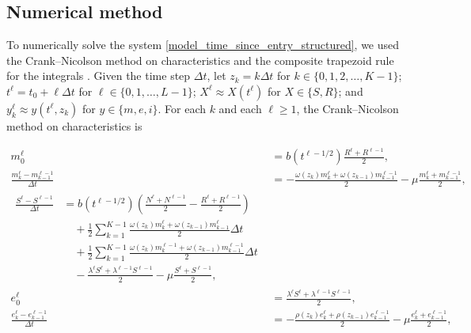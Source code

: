\documentclass{jpmarticle}
\let\subequationsorig\subequations%
\let\endsubequationsorig\endsubequations%
\renewenvironment{subequations}{
  \subequationsorig
  \renewcommand{\theequation}{\theparentequation.\arabic{equation}}
}{
  \endsubequationsorig
}
\begin{document}
\subsection{Numerical method}

To numerically solve the system
\eqref{model_time_since_entry_structured}, we used the Crank--Nicolson
method on characteristics and the composite trapezoid rule for the
integrals \autocite{milner_1992}.  Given the time step $\Delta t$,
let $z_k = k \Delta t$
for $k \in \{0, 1, 2, \ldots, K - 1\}$;
$t^{\ell} = t_0 + \ell \Delta t$
for $\ell \in \{0, 1, \ldots, L - 1\}$;
$X^{\ell} \approx X(t^{\ell})$
for $X \in \{S, R\}$;
and $y_k^{\ell} \approx y(t^{\ell}, z_k)$
for $y \in \{m, e, i\}$.
For each $k$ and each $\ell \geq 1$, the Crank--Nicolson method on
characteristics is
\begin{subequations}
  \begin{align}
    m_0^{\ell} &=
    b(t^{\ell - 1 / 2}) \frac{R^{\ell} + R^{\ell - 1}}{2},
    \\
    \frac{m_k^{\ell} - m_{k - 1}^{\ell - 1}}{\Delta t} &=
    - \frac{\omega(z_k) m_k^{\ell} + \omega(z_{k - 1}) m_{k - 1}^{\ell - 1}}{2}
    - \mu \frac{m_k^{\ell} + m_{k - 1}^{\ell - 1}}{2},
    \\
    \begin{split}
      \frac{S^{\ell} - S^{\ell - 1}}{\Delta t} &=
      b(t^{\ell - 1 / 2}) \left(\frac{N^{\ell} + N^{\ell - 1}}{2}
        - \frac{R^{\ell} + R^{\ell - 1}}{2}\right)
      \\ & \quad {}
      + \frac{1}{2} \sum_{k = 1}^{K - 1}
      \frac{\omega(z_k) m_k^{\ell} + \omega(z_{k - 1}) m_{k - 1}^{\ell}}{2}
      \Delta t
      \\ & \quad {}
      + \frac{1}{2} \sum_{k = 1}^{K - 1}
      \frac{\omega(z_k) m_k^{\ell - 1} + \omega(z_{k - 1}) m_{k - 1}^{\ell - 1}}{2}
      \Delta t
      \\ & \quad {}
      - \frac{\lambda^{\ell} S^{\ell} + \lambda^{\ell - 1} S^{\ell - 1}}{2}
      - \mu \frac{S^{\ell} + S^{\ell - 1}}{2},
    \end{split}
    \\
    e_0^{\ell} &=
    \frac{\lambda^{\ell} S^{\ell} + \lambda^{\ell - 1} S^{\ell - 1}}{2},
    \\
    \frac{e_k^{\ell} - e_{k - 1}^{\ell - 1}}{\Delta t} &=
    - \frac{\rho(z_k) e_k^{\ell} + \rho(z_{k - 1}) e_{k - 1}^{\ell - 1}}{2}
    - \mu \frac{e_k^{\ell} + e_{k - 1}^{\ell - 1}}{2},
    \\
    \begin{split}

\end{split}
\end{align}
\end{subequations}
\end{document}

